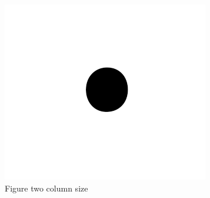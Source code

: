 \begin{figure}
\begin{center}
    \includegraphics[width=\textwidth]{static/figs/fig1.png}
    \caption{Figure two column size}
\label{fig:two_column}
\end{center}
\end{figure}
%
%
%
%
%
\begin{table}[htbp]
\centering
{}
\caption{Hello}
\label{sec:introduction:table}
\end{table}